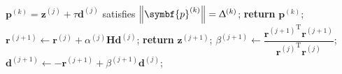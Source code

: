 \begin{algorithm}
\begin{algorithmic}[1]
                        $\symbf{p}^{(k)} = \symbf{z}^{(j)} + \tau \symbf{d}^{(j)}$
                        satisfies
                        $\left \lVert \symbf{p}^{(k)} \right \rVert = \trustradius{k}$;
                    \State \textbf{return} $\symbf{p}^{(k)}$;
                \EndIf
                \State $\symbf{r}^{(j+1)} \gets
                    \symbf{r}^{(j)} +
                    \alpha^{(j)}
                    \symbf{H}
                    \symbf{d}^{(j)}$;
                    \State \textbf{return} $\symbf{z}^{(j+1)}$;
                \EndIf
                \State $\beta^{(j+1)} \gets
                    \dfrac{{\symbf{r}^{(j+1)}}^{\mathrm{T}} \symbf{r}^{(j+1)}}{{\symbf{r}^{(j)}}^{\mathrm{T}} \symbf{r}^{(j)}}$;
                \State $\symbf{d}^{(j+1)} \gets -\symbf{r}^{(j+1)} + \beta^{(j+1)} \symbf{d}^{(j)}$;
            \EndFor
        \EndProcedure
    \end{algorithmic}
\end{algorithm}



